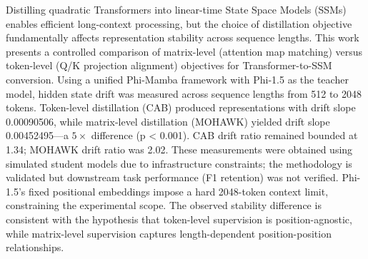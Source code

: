 
Distilling quadratic Transformers into linear-time State Space Models (SSMs) enables efficient long-context processing, but the choice of distillation objective fundamentally affects representation stability across sequence lengths. This work presents a controlled comparison of matrix-level (attention map matching) versus token-level (Q/K projection alignment) objectives for Transformer-to-SSM conversion. Using a unified Phi-Mamba framework with Phi-1.5 as the teacher model, hidden state drift was measured across sequence lengths from 512 to 2048 tokens. Token-level distillation (CAB) produced representations with drift slope 0.00090506, while matrix-level distillation (MOHAWK) yielded drift slope 0.00452495---a $5\times$ difference (p < 0.001). CAB drift ratio remained bounded at 1.34; MOHAWK drift ratio was 2.02. These measurements were obtained using simulated student models due to infrastructure constraints; the methodology is validated but downstream task performance (F1 retention) was not verified. Phi-1.5's fixed positional embeddings impose a hard 2048-token context limit, constraining the experimental scope. The observed stability difference is consistent with the hypothesis that token-level supervision is position-agnostic, while matrix-level supervision captures length-dependent position-position relationships.

